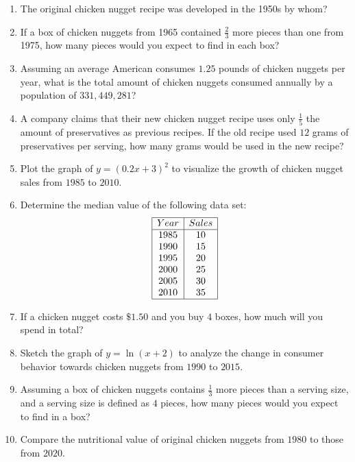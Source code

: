 \documentclass{article}
\begin{document}
\begin{enumerate}
\item The original chicken nugget recipe was developed in the 1950s by whom? \vspace{2cm} \item If a box of chicken nuggets from 1965 contained $ \frac{2}{3} $ more pieces than one from 1975, how many pieces would you expect to find in each box? \vspace{2cm} \item Assuming an average American consumes $ 1.25 $ pounds of chicken nuggets per year, what is the total amount of chicken nuggets consumed annually by a population of $ 331,449,281 $? \vspace{2cm} \item A company claims that their new chicken nugget recipe uses only $ \frac{1}{5} $ the amount of preservatives as previous recipes. If the old recipe used $ 12 $ grams of preservatives per serving, how many grams would be used in the new recipe? \vspace{2cm} \item Plot the graph of $ y = (0.2x + 3)^2 $ to visualize the growth of chicken nugget sales from $ 1985 $ to $ 2010 $. \vspace{2cm} \item Determine the median value of the following data set: \[ \begin{array}{|c|c|} \hline Year & Sales \\ \hline 1985 & 10 \\ 1990 & 15 \\ 1995 & 20 \\ 2000 & 25 \\ 2005 & 30 \\ 2010 & 35 \\ \hline \end{array} \] \vspace{2cm} \item If a chicken nugget costs $ \$1.50 $ and you buy $ 4 $ boxes, how much will you spend in total? \vspace{2cm} \item Sketch the graph of $ y = \ln(x + 2) $ to analyze the change in consumer behavior towards chicken nuggets from $ 1990 $ to $ 2015 $. \vspace{2cm} \item Assuming a box of chicken nuggets contains $ \frac{1}{3} $ more pieces than a serving size, and a serving size is defined as $ 4 $ pieces, how many pieces would you expect to find in a box? \vspace{2cm} \item Compare the nutritional value of original chicken nuggets from $ 1980 $ to those from $ 2020 $. \vspace{2cm}
\end{enumerate}
\end{document}
